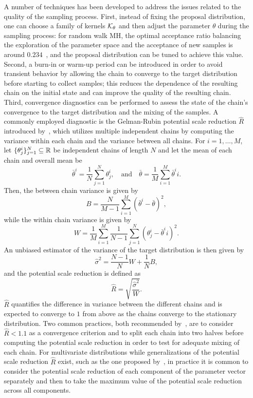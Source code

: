 A number of techniques has been developed to address the issues related to the quality of the sampling process.
First, instead of fixing the proposal distribution, one can choose a family of kernels $\mathcal K_\theta$ and then adjust the parameter $\theta$ during the sampling process: for random walk MH, the optimal acceptance ratio balancing the exploration of the parameter space and the acceptance of new samples is around $0.234$~\cite{GelmanGilksRoberts1997}, and the proposal distribution can be tuned to achieve this value.
Second, a burn-in or warm-up period can be introduced in order to avoid transient behavior by allowing the chain to converge to the target distribution before starting to collect samples; this reduces the dependence of the resulting chain on the initial state and can improve the quality of the resulting chain.
Third, convergence diagnostics can be performed to assess the state of the chain's convergence to the target distribution and the mixing of the samples.
A commonly employed diagnostic is the Gelman-Rubin potential scale reduction $\hat R$ introduced by~\cite{GelmanRubin1992}, which utilizes multiple independent chains by computing the variance within each chain and the variance between all chains.
For $i =1, \dots, M$, let $\{ \theta_{j}^i \}_{j=1}^{N} \subseteq \mathbb{R} $ be independent chains of length $N$ and let the mean of each chain and overall mean be 
\[
    \bar \theta^i = \frac{1}{N} \sum_{j=1}^{N} \theta_{j}^i, \quad \text{and} \quad \bar \theta = \frac{1}{M} \sum_{i=1}^{M} \bar \theta^ii.
\]
Then, the between chain variance is given by
\[
    B = \frac{N}{M-1} \sum_{i=1}^{M} (\bar \theta^i - \bar \theta)^2,
\]
while the within chain variance is given by
\[
    W = \frac{1}{M} \sum_{i=1}^{M} \frac{1}{N-1} \sum_{j=1}^{N} (\theta_{j}^i - \bar \theta^ii)^2.
\]
An unbiased estimator of the variance of the target distribution is then given by
\[
    \hat \sigma^2 = \frac{N-1}{N} W + \frac{1}{N}B,
\]
and the potential scale reduction is defined as 
\[
    \hat R = \sqrt{ \frac{\hat \sigma^2}{W} }.
\]  
$\hat R$ quantifies the difference in variance between the different chains and is expected to converge to $1$ from above as the chains converge to the stationary distribution. 
Two common practices, both recommended by~\cite[Chapter 11.4]{GelmanCarlinSternDunsonVehtariRubin2013}, are to consider $\hat R < 1.1$ as a convergence criterion and to split each chain into two halves before computing the potential scale reduction in order to test for adequate mixing of each chain.
For multivariate distributions while generalizations of the potential scale reduction $\hat R$ exist, such as the one proposed by~\cite{BrooksGelman1998}, in practice it is common to consider the potential scale reduction of each component of the parameter vector separately and then to take the maximum value of the potential scale reduction across all components.

